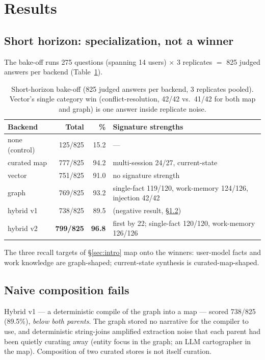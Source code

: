 \section{Results}
\label{sec:results}

\subsection{Short horizon: specialization, not a winner}
\label{sec:bakeoff}

The bake-off runs 275 questions (spanning 14 users) $\times$ 3 replicates $=$
825 judged answers per backend (Table~\ref{tab:bakeoff}).

\begin{table}[t]
\centering
\small
\caption{Short-horizon bake-off (825 judged answers per backend, 3 replicates
pooled). Vector's single category win (conflict-resolution, 42/42 vs.\
41/42 for both map and graph) is one answer inside replicate noise.}
\label{tab:bakeoff}
\begin{tabular}{lrrl}
\toprule
Backend & Total & \% & Signature strengths \\
\midrule
none (control) & 125/825 & 15.2 & --- \\
curated map    & 777/825 & 94.2 & multi-session 24/27, current-state \\
vector         & 751/825 & 91.0 & no signature strength \\
graph          & 769/825 & 93.2 & single-fact 119/120, work-memory 124/126, injection 42/42 \\
hybrid v1      & 738/825 & 89.5 & (negative result, \S\ref{sec:hybrid1}) \\
hybrid v2      & \textbf{799/825} & \textbf{96.8} & first by 22; single-fact 120/120, work-memory 126/126 \\
\bottomrule
\end{tabular}
\end{table}

The three recall targets of \S\ref{sec:intro} map onto the winners:
user-model facts and work knowledge are graph-shaped; current-state
synthesis is curated-map-shaped.

\subsection{Naive composition fails}
\label{sec:hybrid1}

Hybrid v1 --- a deterministic compile of the graph into a map --- scored
738/825 (89.5\%), \emph{below both parents}. The graph stored no narrative
for the compiler to use, and deterministic string-joins amplified extraction
noise that each parent had been quietly curating away (entity focus in the
graph; an LLM cartographer in the map). Composition of two curated stores is
not itself curation.

